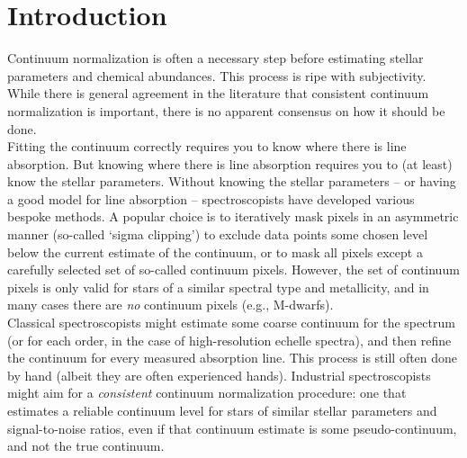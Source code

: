 \documentclass[modern]{aastex631}
\begin{document}


\section*{}\clearpage
\section{Introduction}\label{sec:intro}

Continuum normalization is often a necessary step before estimating stellar parameters and chemical abundances.
This process is ripe with subjectivity.
While there is general agreement in the literature that consistent continuum normalization is important, there is no apparent consensus on how it should be done.\\

Fitting the continuum correctly requires you to know where there is line absorption. But knowing where there is line absorption requires you to (at least) know the stellar parameters. Without knowing the stellar parameters -- or having a good model for line absorption -- spectroscopists have developed various bespoke methods. A popular choice is to iteratively mask pixels in an asymmetric manner (so-called `sigma clipping') to exclude data points some chosen level below the current estimate of the continuum, or to mask all pixels except a carefully selected set of so-called continuum pixels. However, the set of continuum pixels is only valid for stars of a similar spectral type and metallicity, and in many cases there are \emph{no} continuum pixels (e.g., M-dwarfs).\\

Classical spectroscopists might estimate some coarse continuum for the spectrum (or for each order, in the case of high-resolution echelle spectra), and then refine the continuum for every measured absorption line. This process is still often done by hand (albeit they are often experienced hands). Industrial spectroscopists might aim for a \emph{consistent} continuum normalization procedure: one that estimates a reliable continuum level for stars of similar stellar parameters and signal-to-noise ratios, even if that continuum estimate is some pseudo-continuum, and not the true continuum.\\
\end{document}
